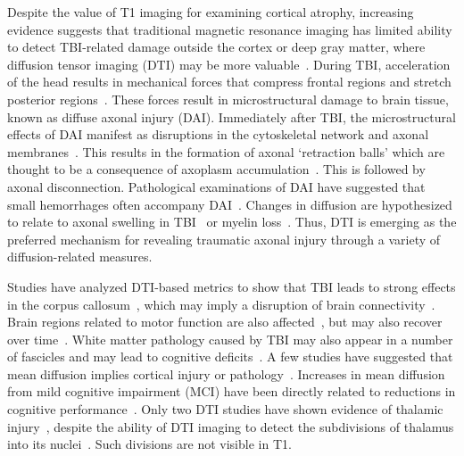Despite the value of T1 imaging for examining cortical atrophy, increasing evidence suggests that traditional magnetic resonance imaging has limited ability to detect TBI-related damage outside the cortex or deep gray matter, where diffusion tensor imaging (DTI) may be more valuable~\cite{Ahn2006,Bazarian2007,Donald2007a,Lee2006}. During TBI, acceleration of the head results in mechanical forces that compress frontal regions and stretch posterior regions~\cite{Bayly2005}. These forces result in microstructural damage to brain tissue, known as diffuse axonal injury (DAI). Immediately after TBI, the microstructural effects of DAI manifest as disruptions in the cytoskeletal network and axonal membranes~\cite{Arfanakis2002,Benson2007,Liu1999}. This results in the formation of axonal `retraction balls' which are thought to be a consequence of axoplasm accumulation~\cite{Bullock2005}. This is followed by axonal disconnection. Pathological examinations of DAI have suggested that small hemorrhages often accompany DAI~\cite{Scheid2007}. Changes in diffusion are hypothesized to relate to axonal swelling in TBI~\cite{Bazarian2007} or myelin loss~\cite{Song2002}. Thus, DTI is emerging as the preferred mechanism for revealing traumatic axonal injury through a variety of diffusion-related measures. 

Studies have analyzed DTI-based metrics to show that TBI leads to strong effects in the corpus callosum~\cite{Levin2000,Ewing-Cobbs2006,hashimoto2007,Inglese2005,Nakayama2006,Xu2007,Kumar2009,Lipton2008,Miles2008,Rutgers2008,Sidaros2008,Takayama2000,Voss2006}, which may imply a disruption of brain connectivity~\cite{Sugiyama2007,Le2005}. Brain regions related to motor function are also affected~\cite{Lee2006,Yasokawa2007}, but may also recover over time~\cite{Han2007}. White matter pathology caused by TBI may also appear in a number of fascicles and may lead to cognitive deficits~\cite{Kraus2007}. A few studies have suggested that mean diffusion implies cortical injury or pathology~\cite{Ardekani2005,Kantarci2001,Chappell2006}. Increases in mean diffusion from mild cognitive impairment (MCI) have been directly related to reductions in cognitive performance~\cite{Ray2006}. Only two DTI studies have shown evidence of thalamic injury~\cite{Salmond2006,Avants2008}, despite the ability of DTI imaging to detect the subdivisions of thalamus into its nuclei~\cite{Duan2007,Wiegell2003}. Such divisions are not visible in T1.

